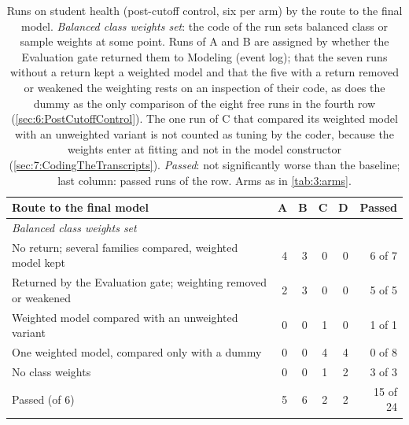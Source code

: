 \begin{table}[htbp]
  \centering
  \small
  \caption[Routes on student health]{Runs on student health (post-cutoff control, six per arm) by the route to the final model. \emph{Balanced class weights set}: the code of the run sets balanced class or sample weights at some point. Runs of A and B are assigned by whether the Evaluation gate returned them to Modeling (event log); that the seven runs without a return kept a weighted model and that the five with a return removed or weakened the weighting rests on an inspection of their code, as does the dummy as the only comparison of the eight free runs in the fourth row (\autoref{sec:6:PostCutoffControl}). The one run of C that compared its weighted model with an unweighted variant is not counted as tuning by the coder, because the weights enter at fitting and not in the model constructor (\autoref{sec:7:CodingTheTranscripts}). \emph{Passed}: not significantly worse than the baseline; last column: passed runs of the row. Arms as in \autoref{tab:3:arms}.}
  \label{tab:7:studenthealth}
  \begin{tabular}{lrrrrr}
    \toprule
    Route to the final model & A & B & C & D & Passed \\
    \midrule
    \multicolumn{6}{l}{\emph{Balanced class weights set}} \\
    \quad No return; several families compared, weighted model kept & 4 & 3 & 0 & 0 & 6 of 7 \\
    \quad Returned by the Evaluation gate; weighting removed or weakened & 2 & 3 & 0 & 0 & 5 of 5 \\
    \quad Weighted model compared with an unweighted variant & 0 & 0 & 1 & 0 & 1 of 1 \\
    \quad One weighted model, compared only with a dummy & 0 & 0 & 4 & 4 & 0 of 8 \\
    \midrule
    No class weights & 0 & 0 & 1 & 2 & 3 of 3 \\
    \midrule
    Passed (of 6) & 5 & 6 & 2 & 2 & 15 of 24 \\
    \bottomrule
  \end{tabular}
\end{table}
